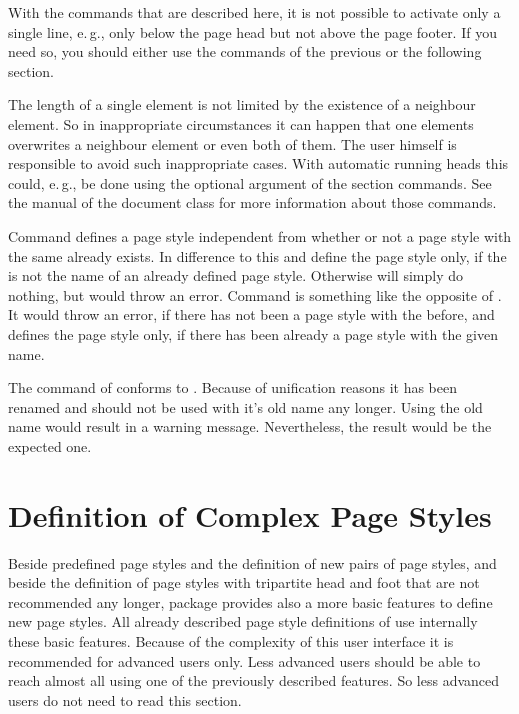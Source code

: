With the commands that are described here, it is not possible to activate only
a single line, e.\,g., only below the page head but not above the page
footer. If you need so, you should either use the commands of the previous or
the following section.

The length of a single element is not limited by the
existence of a neighbour element. So in inappropriate circumstances it can
happen that one elements overwrites a neighbour element or even both of
them. The user himself is responsible to avoid such inappropriate cases. With
automatic running heads this could, e.\,g., be done using the optional
argument of the section commands. See the manual of the document class for
more information about those commands.

Command  defines a page style independent from
whether or not a page style with the same 
already exists. In difference to this  and
 define the page style only, if the  is not the name of an already defined page
style. Otherwise  will simply do nothing, but
 would throw an error. Command
 is something like the opposite of
. It would throw an error, if there has not been
a page style with the  before, and defines the
page style only, if there has been already a page style with the given name.

%
The command  of  conforms to
. Because of unification reasons it has been renamed
and should not be used with it's old name any longer. Using the old name would
result in a warning message. Nevertheless, the result would be the expected
one.%
%
%
%
%
%


\section{Definition of Complex Page Styles}
\label{sec:scrlayer-scrpage.pagestyle.experts}

Beside predefined page styles and the definition of new pairs of page styles,
and beside the definition of page styles with tripartite head and foot that
are not recommended any longer, package  provides
also a more basic features to define new page styles. All already described
page style definitions of  use internally these basic
features. Because of the complexity of this user interface it is recommended
for advanced users only. Less advanced users should be able to reach almost all
using one of the previously described features. So less advanced users do not
need to read this section.
 
